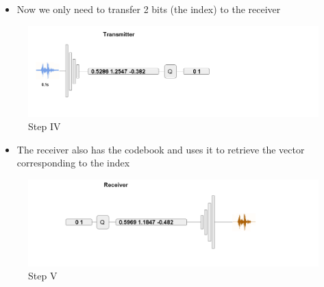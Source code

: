 \documentclass[12pt]{report}
\begin{document}
\begin{itemize}
  \item Now we only need to transfer 2 bits (the index) to the receiver
\end{itemize}
\begin{figure}[H]
\includegraphics[width=1\textwidth]{Images/compress4.png}
\caption{Step IV}
\end{figure}

\begin{itemize}
  \item The receiver also has the codebook and uses it to retrieve the vector corresponding to the index
\end{itemize}
\begin{figure}[H]
\includegraphics[width=1\textwidth]{Images/compress5.png}
\caption{Step V}
\end{figure}
\end{document}
